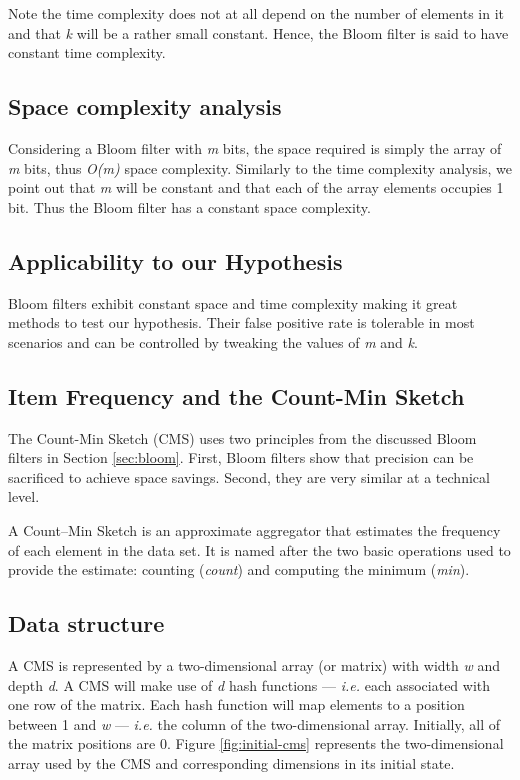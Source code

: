 Note the time complexity does not at all depend on the number of elements in it and that \textit{k} will be a rather small constant. Hence, the Bloom filter is said to have constant time complexity.

\subsection*{Space complexity analysis}
Considering a Bloom filter with \textit{m} bits, the space required is simply the array of \textit{m} bits, thus \textit{O(m)} space complexity. Similarly to the time complexity analysis, we point out that \textit{m} will be constant and that each of the array elements occupies 1 bit. Thus the Bloom filter has a constant space complexity.

\subsection*{Applicability to our Hypothesis}
Bloom filters exhibit constant space and time complexity making it great methods to test our hypothesis. Their false positive rate is tolerable in most scenarios and can be controlled by tweaking the values of \textit{m} and \textit{k}.

\subsection{Item Frequency and the Count-Min Sketch}
The Count-Min Sketch (CMS) uses two principles from the discussed Bloom filters in Section \ref{sec:bloom}. First, Bloom filters show that precision can be sacrificed to achieve space savings. Second, they are very similar at a technical level.

A Count–Min Sketch \cite{Cormode-CMS} is an approximate aggregator that estimates the frequency of each element in the data set. It is named after the two basic operations used to provide the estimate: counting (\textit{count}) and computing the minimum (\textit{min}).

\subsection*{Data structure}
A CMS is represented by a two-dimensional array (or matrix) with width \textit{w} and depth \textit{d}. A CMS will make use of \textit{d} hash functions --- \textit{i.e.} each associated with one row of the matrix. Each hash function will map elements to a position between 1 and \textit{w} --- \textit{i.e.} the column of the two-dimensional array. Initially, all of the matrix positions are 0. Figure \ref{fig:initial-cms} represents the two-dimensional array used by the CMS and corresponding dimensions in its initial state. 

